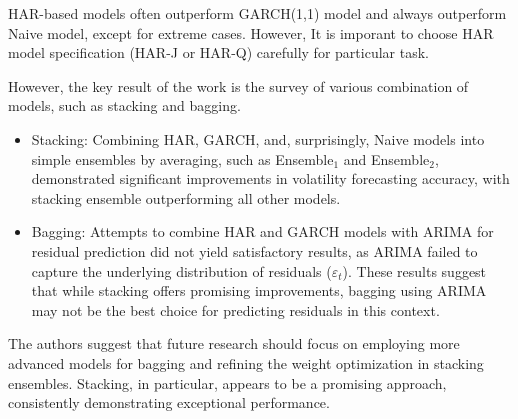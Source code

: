 HAR-based models often outperform GARCH(1,1) model and always outperform Naive model, except for extreme cases. However, It is imporant to choose HAR model specification (HAR-J or HAR-Q) carefully for particular task. 

\vspace{5pt}
However, the key result of the work is the survey of various combination of models, such as stacking and bagging.

\begin{itemize}
    \item Stacking: Combining HAR, GARCH, and, surprisingly, Naive models into simple ensembles by averaging, such as Ensemble$_1$ and Ensemble$_2$, demonstrated significant improvements in volatility forecasting accuracy, with stacking ensemble outperforming all other models.
    \item Bagging: Attempts to combine HAR and GARCH models with ARIMA for residual prediction did not yield satisfactory results, as ARIMA failed to capture the underlying distribution of residuals (\(\varepsilon_t\)).  These results suggest that while stacking offers promising improvements, bagging using ARIMA may not be the best choice for predicting residuals in this context.
\end{itemize}


\vspace{5pt}

The authors suggest that future research should focus on employing more advanced models for bagging and refining the weight optimization in stacking ensembles. Stacking, in particular, appears to be a promising approach, consistently demonstrating exceptional performance.